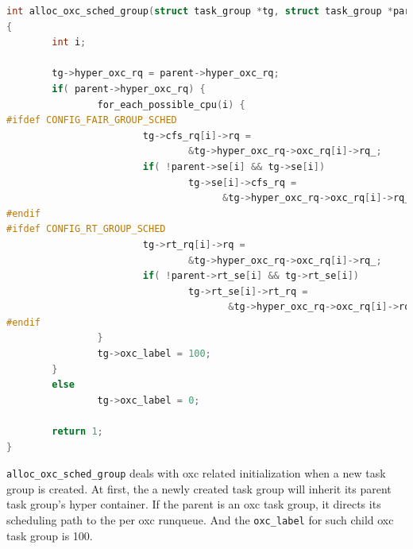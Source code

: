 \begin{lstlisting}[language=C,
        caption={OXC scheduling related initilization 
					during task group creation}]
int alloc_oxc_sched_group(struct task_group *tg, struct task_group *parent)
{
        int i;

        tg->hyper_oxc_rq = parent->hyper_oxc_rq;
        if( parent->hyper_oxc_rq) {
                for_each_possible_cpu(i) {
#ifdef CONFIG_FAIR_GROUP_SCHED
                        tg->cfs_rq[i]->rq =
                                &tg->hyper_oxc_rq->oxc_rq[i]->rq_;
                        if( !parent->se[i] && tg->se[i])
                                tg->se[i]->cfs_rq =
                                      &tg->hyper_oxc_rq->oxc_rq[i]->rq_.cfs;
#endif
#ifdef CONFIG_RT_GROUP_SCHED
                        tg->rt_rq[i]->rq =
                                &tg->hyper_oxc_rq->oxc_rq[i]->rq_;
                        if( !parent->rt_se[i] && tg->rt_se[i])
                                tg->rt_se[i]->rt_rq =
                                       &tg->hyper_oxc_rq->oxc_rq[i]->rq_.rt;
#endif
                }
                tg->oxc_label = 100;
        }
        else
                tg->oxc_label = 0;

        return 1;
}
\end{lstlisting}
\texttt{alloc\_oxc\_sched\_group} deals with oxc related initialization when a 
new task group is created. At first, the a newly created task group will inherit
its parent task group's hyper container. If the parent is an oxc task group, it
directs its scheduling path to the per oxc runqueue. And the \texttt{oxc\_label}
for such child oxc task group is 100.

